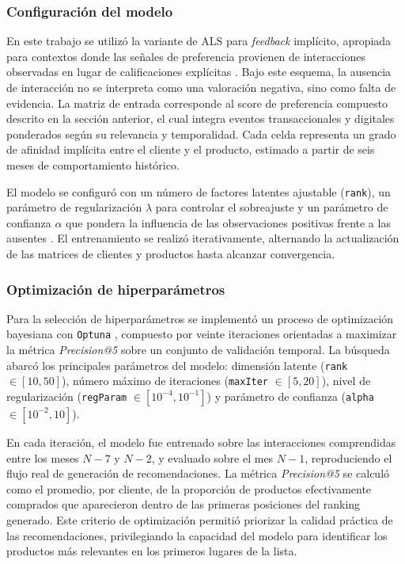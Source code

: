 \subsubsection{Configuración del modelo}

En este trabajo se utilizó la variante de ALS para \textit{feedback} implícito, apropiada para contextos donde las señales de preferencia provienen de interacciones observadas en lugar de calificaciones explícitas \cite{ARTICLE:Hu2008}. Bajo este esquema, la ausencia de interacción no se interpreta como una valoración negativa, sino como falta de evidencia. La matriz de entrada corresponde al score de preferencia compuesto descrito en la sección anterior, el cual integra eventos transaccionales y digitales ponderados según su relevancia y temporalidad. Cada celda representa un grado de afinidad implícita entre el cliente y el producto, estimado a partir de seis meses de comportamiento histórico.

El modelo se configuró con un número de factores latentes ajustable (\texttt{rank}), un parámetro de regularización $\lambda$ para controlar el sobreajuste y un parámetro de confianza $\alpha$ que pondera la influencia de las observaciones positivas frente a las ausentes \cite{ARTICLE:Hu2008}. El entrenamiento se realizó iterativamente, alternando la actualización de las matrices de clientes y productos hasta alcanzar convergencia.

\subsubsection{Optimización de hiperparámetros}

Para la selección de hiperparámetros se implementó un proceso de optimización bayesiana con \texttt{Optuna} \cite{ARTICLE:Akiba2019}, compuesto por veinte iteraciones orientadas a maximizar la métrica \textit{Precision@5} sobre un conjunto de validación temporal. La búsqueda abarcó los principales parámetros del modelo: dimensión latente (\texttt{rank} $\in [10, 50]$), número máximo de iteraciones (\texttt{maxIter} $\in [5, 20]$), nivel de regularización (\texttt{regParam} $\in [10^{-4}, 10^{-1}]$) y parámetro de confianza (\texttt{alpha} $\in [10^{-2}, 10]$). 

En cada iteración, el modelo fue entrenado sobre las interacciones comprendidas entre los meses $N-7$ y $N-2$, y evaluado sobre el mes $N-1$, reproduciendo el flujo real de generación de recomendaciones. La métrica \textit{Precision@5} se calculó como el promedio, por cliente, de la proporción de productos efectivamente comprados que aparecieron dentro de las primeras posiciones del ranking generado. Este criterio de optimización permitió priorizar la calidad práctica de las recomendaciones, privilegiando la capacidad del modelo para identificar los productos más relevantes en los primeros lugares de la lista.

